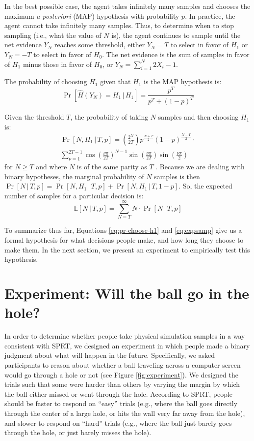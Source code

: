 \documentclass[10pt,letterpaper]{article}
\begin{document}
In the best possible case, the agent takes infinitely many samples and chooses the maximum \emph{a posteriori} (MAP) hypothesis with probability $p$. 
In practice, the agent cannot take infinitely many samples. 
Thus, to determine when to stop sampling (i.e., what the value of $N$ is), the agent continues to sample until the net evidence $Y_N$ reaches some threshold, either $Y_N=T$ to select in favor of $H_1$ or $Y_N=-T$ to select in favor of $H_0$. 
The net evidence is the sum of samples in favor of $H_1$ minus those in favor of $H_0$, or $Y_N=\sum_{i=1}^N 2X_i-1$.

The probability of choosing $H_1$ given that $H_1$ is the MAP hypothesis is:
\begin{equation}
\Pr[\hat{H}(Y_N)=H_1\,|\,H_1]=\frac{p^T}{p^T+(1-p)^T}
\label{eq:pr-choose-h1}
\end{equation}

Given the threshold $T$, the probability of taking $N$ samples and then choosing $H_1$ is:
\begin{multline}
\Pr[N,H_1\,|\,T,p]=\left(\frac{2^N}{2T}\right)p^{\frac{N+T}{2}}(1-p)^{\frac{N-T}{2}}\cdot{}\\
\sum_{\nu=1}^{2T-1}\cos\left(\frac{\nu\pi}{2T}\right)^{N-1}\sin\left(\frac{\nu\pi}{2T}\right)\sin\left(\frac{\nu\pi}{2}\right)
\end{multline}
for $N\geq T$ and where $N$ is of the same parity as $T$ \cite[ch.~XIV, eq. 5.7]{Feller:1968ut}. 
Because we are dealing with binary hypotheses, the marginal probability of $N$ samples is then $\Pr[N\,|\,T,p]=\Pr[N,H_1\,|\,T,p]+\Pr[N,H_1\,|\,T,1-p]$.
So, the expected number of samples for a particular decision is:
\begin{equation}
\mathbb{E}[N\,|\,T,p]=\sum_{N=T}^\infty N\cdot{}\Pr[N\,|\,T,p]
\label{eq:expsamp}
\end{equation}

To summarize thus far, Equations \ref{eq:pr-choose-h1} and \ref{eq:expsamp} give us a formal hypothesis for what decisions people make, and how long they choose to make them. 
In the next section, we present an experiment to empirically test this hypothesis.

\section{Experiment: Will the ball go in the hole?}

In order to determine whether people take physical simulation samples in a way consistent with SPRT, we designed an experiment in which people made a binary judgment about what will happen in the future.
Specifically, we asked participants to reason about whether a ball traveling across a computer screen would go through a hole or not (see Figure \ref{fig:experiment}).
We designed the trials such that some were harder than others by varying the margin by which the ball either missed or went through the hole.
According to SPRT, people should be faster to respond on ``easy'' trials (e.g., where the ball goes directly through the center of a large hole, or hits the wall very far away from the hole), and slower to respond on ``hard'' trials (e.g., where the ball just barely goes through the hole, or just barely misses the hole).
\end{document}
